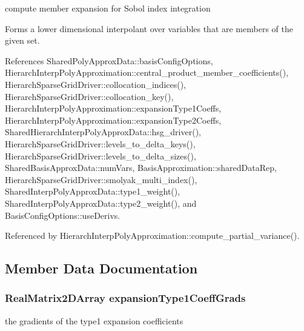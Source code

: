 compute member expansion for Sobol\textquotesingle{} index integration 

Forms a lower dimensional interpolant over variables that are members of the given set. 

References Shared\+Poly\+Approx\+Data\+::basis\+Config\+Options, Hierarch\+Interp\+Poly\+Approximation\+::central\+\_\+product\+\_\+member\+\_\+coefficients(), Hierarch\+Sparse\+Grid\+Driver\+::collocation\+\_\+indices(), Hierarch\+Sparse\+Grid\+Driver\+::collocation\+\_\+key(), Hierarch\+Interp\+Poly\+Approximation\+::expansion\+Type1\+Coeffs, Hierarch\+Interp\+Poly\+Approximation\+::expansion\+Type2\+Coeffs, Shared\+Hierarch\+Interp\+Poly\+Approx\+Data\+::hsg\+\_\+driver(), Hierarch\+Sparse\+Grid\+Driver\+::levels\+\_\+to\+\_\+delta\+\_\+keys(), Hierarch\+Sparse\+Grid\+Driver\+::levels\+\_\+to\+\_\+delta\+\_\+sizes(), Shared\+Basis\+Approx\+Data\+::num\+Vars, Basis\+Approximation\+::shared\+Data\+Rep, Hierarch\+Sparse\+Grid\+Driver\+::smolyak\+\_\+multi\+\_\+index(), Shared\+Interp\+Poly\+Approx\+Data\+::type1\+\_\+weight(), Shared\+Interp\+Poly\+Approx\+Data\+::type2\+\_\+weight(), and Basis\+Config\+Options\+::use\+Derivs.



Referenced by Hierarch\+Interp\+Poly\+Approximation\+::compute\+\_\+partial\+\_\+variance().



\subsection{Member Data Documentation}
\subsubsection[{\texorpdfstring{expansion\+Type1\+Coeff\+Grads}{expansionType1CoeffGrads}}]{\setlength{\rightskip}{0pt plus 5cm}Real\+Matrix2\+D\+Array expansion\+Type1\+Coeff\+Grads\hspace{0.3cm}{\ttfamily [private]}}\label{classPecos_1_1HierarchInterpPolyApproximation_ad99e5330509824547f220676f9c250fe}


the gradients of the type1 expansion coefficients 

